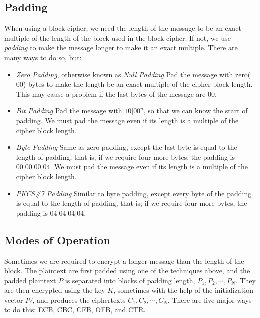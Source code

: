 \documentclass{report}
\begin{document}
		\subsection{Padding}
		When using a block cipher, we need the length of the message to be an exact multiple of the length of the block used in the block cipher. If not, we use \emph{padding} to make the message longer to make it an exact multiple. There are many ways to do so, but:
		\begin{itemize}
			\item \emph{Zero Padding}, otherwise known as \emph{Null Padding}
			\subitem Pad the message with zero($00$) bytes to make the length be an exact multiple of the cipher block length. This may cause a problem if the last bytes of the message are $00$.
			
			\item \emph{Bit Padding}
			\subitem Pad the message with $10|00^n$, so that we can know the start of padding. We must pad the message even if its length is a multiple of the cipher block length.
			
			\item \emph{Byte Padding}
			\subitem Same as zero padding, except the last byte is equal to the length of padding, that is; if we require four more bytes, the padding is $00|00|00|04$. We must pad the message even if its length is a multiple of the cipher block length.
			
			\item \emph{PKCS\#7 Padding}
			\subitem Similar to byte padding, except every byte of the padding is equal to the length of padding, that is; if we require four more bytes, the padding is $04|04|04|04$.
		\end{itemize}
	
		\subsection{Modes of Operation}
			Sometimes we are required to encrypt a longer message than the length of the block. The plaintext are first padded using one of the techniques above, and the padded plaintext $P$ is separated into blocks of padding length, $P_1,P_2,\cdots,P_N$. They are then encrypted using the key $K$, sometimes with the help of the initialization vector $IV$, and produces the ciphertexts $C_1,C_2,\cdots,C_N$. There are five major ways to do this; ECB, CBC, CFB, OFB, and CTR.
			
\end{document}
